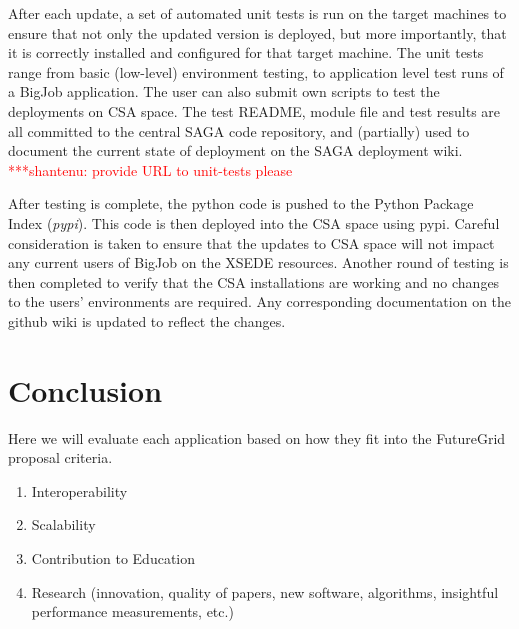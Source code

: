 \documentclass[]{paper}
\newcommand{\jhanote}[1]{ {\textcolor{red} { ***shantenu: #1 }}}
\newcommand{\jhanote}[1]{}
\begin{document}
After each update, a set of automated unit tests is run on the target
machines to ensure that not only the updated version is deployed, but
more importantly, that it is correctly installed and configured for
that target machine. The unit tests range from basic (low-level)
environment testing, to application level test runs of a BigJob
application. The user can also submit own scripts to test the
deployments on CSA space. The test README, module file and test
results are all committed to the central SAGA code repository, and
(partially) used to document the current state of deployment on the
SAGA deployment wiki.  \jhanote{provide URL to unit-tests please}


After testing is complete, the python code is pushed to the Python
Package Index (\textit{pypi}). This code is then deployed into the CSA
space using pypi. Careful consideration is taken to ensure that the
updates to CSA space will not impact any current users of BigJob on
the XSEDE resources. Another round of testing is then completed to
verify that the CSA installations are working and no changes to the
users' environments are required. Any corresponding documentation on
the github wiki is updated to reflect the changes.


\section{Conclusion}
Here we will evaluate each application based on how they fit into the
FutureGrid proposal criteria.
\begin{enumerate}
\item Interoperability
\item Scalability
\item Contribution to Education
\item Research (innovation, quality of papers, new software, algorithms, insightful performance measurements, etc.)

\end{enumerate}
\begin{thebibliography}{9}
\end{thebibliography}
\end{document}
